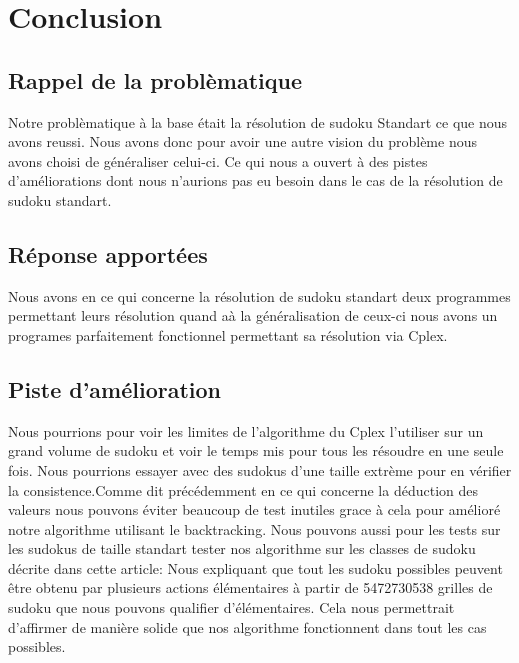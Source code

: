 \hypertarget{conclusion}{%
\chapter{Conclusion}\label{conclusion}}

\section{Rappel de la problèmatique}

Notre problèmatique à la base était la résolution de sudoku Standart ce que nous avons reussi. Nous avons donc pour avoir une autre vision du problème nous avons choisi de généraliser celui-ci. Ce qui nous a ouvert à des pistes d'améliorations dont nous n'aurions pas eu besoin dans le cas de la résolution de sudoku standart.

\section{Réponse apportées}
Nous avons en ce qui concerne la résolution de sudoku standart deux programmes permettant leurs résolution quand aà la généralisation de ceux-ci nous avons un programes parfaitement fonctionnel permettant sa résolution via Cplex.
\section{Piste d'amélioration}
Nous pourrions pour voir les limites de l'algorithme du Cplex l'utiliser sur un grand volume de sudoku et voir le temps mis pour tous les résoudre en une seule fois. Nous pourrions essayer avec des sudokus d'une taille extrème pour en vérifier la consistence.\newline Comme dit précédemment en ce qui concerne la déduction des valeurs nous pouvons éviter beaucoup de test inutiles grace à cela pour amélioré notre algorithme utilisant le backtracking.\newline
Nous pouvons aussi pour les tests sur les sudokus de taille standart tester nos algorithme sur les classes de sudoku décrite dans cette article:\newline
\cite{Differents}
\newline
Nous expliquant que tout les sudoku possibles peuvent être obtenu par plusieurs actions élémentaires à partir de 5472730538 grilles de sudoku que nous pouvons qualifier d'élémentaires.
Cela nous permettrait d'affirmer de manière solide que nos algorithme fonctionnent dans tout les cas possibles.

